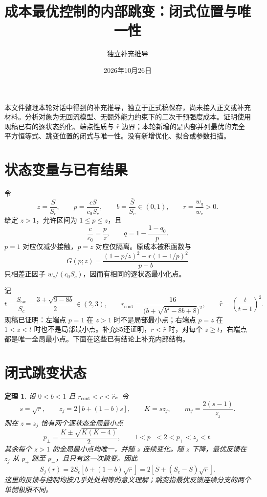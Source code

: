 \documentclass[11pt,a4paper]{ctexart}
\title{成本最优控制的内部跳变：闭式位置与唯一性}
\author{独立补充推导}
\date{2026年10月26日}
\newtheorem{theorem}{定理}
\newcommand{\rcont}{r_{\mathrm{cont}}}
\newcommand{\Sj}{S_j}
\newcommand{\Ssw}{S_{\mathrm{sw}}}
\begin{document}
\maketitle

本文件整理本轮对话中得到的补充推导，独立于正式稿保存，尚未接入正文或补充材料。分析对象为无回流模型、无额外能力约束下的二次干预强度成本。证明使用现稿已有的逐状态约化、端点性质与 $\hat r$ 边界；本轮新增的是内部并列最优的完全平方恒等式、跳变位置的闭式与唯一性。没有新增优化、拟合或参数扫描。

\section{状态变量与已有结果}

令
\[
 z=\frac{S}{S_c},\qquad p=\frac{cS}{c_0S_c},\qquad
 b=\frac{\bar S}{S_c}\in(0,1),\qquad r=\frac{w_q}{w_c}>0.
\]
给定 $z>1$，允许区间为 $1\le p\le z$，且
\[
 \frac{c}{c_0}=\frac pz,\qquad q=1-\frac{1-q_0}{p}.
\]
$p=1$ 对应仅减少接触，$p=z$ 对应仅隔离。原成本被积函数与
\begin{equation}
 G(p;z)=\frac{(1-p/z)^2+r(1-1/p)^2}{p-b}
 \label{eq:G}
\end{equation}
只相差正因子 $w_c/(c_0S_c)$，因而有相同的逐状态最小化点。

记
\begin{equation}
 t=\frac{\Ssw}{S_c}=\frac{3+\sqrt{9-8b}}2\in(2,3),\qquad
 \rcont=\frac{16}{\bigl(b+\sqrt{b^2-8b+8}\bigr)^2},\qquad
 \hat r=\left(\frac{t}{t-1}\right)^2.
 \label{eq:bounds}
\end{equation}
现稿已证明：左端点 $p=1$ 在 $z>1$ 时不是局部最小点；右端点 $p=z$ 在 $1<z<t$ 时也不是局部最小点。补充S5还证明，$r<\hat r$ 时，对每个 $z\ge t$，右端点都是唯一全局最小点。下面在这些已有结论上补充内部结构。

\section{闭式跳变状态}

\begin{theorem}\label{thm:jump}
设 $0<b<1$ 且 $\rcont<r<\hat r$。令
\begin{equation}
 s=\sqrt r,\qquad z_j=2[b+(1-b)s],\qquad
 K=sz_j,\qquad m_j=\frac{2(s-1)}{z_j}.
 \label{eq:jump-def}
\end{equation}
则在 $z=z_j$ 恰有两个逐状态全局最小点
\begin{equation}
 p_\pm=\frac{K\pm\sqrt{K(K-4)}}2,
 \qquad 1<p_-<2<p_+<z_j<t.
 \label{eq:two-roots}
\end{equation}
其余每个 $z>1$ 的全局最小点均唯一，并随 $z$ 连续变化。随 $z$ 下降，最优反馈在 $z_j$ 从 $p_+$ 跳至 $p_-$，且只有这一次跳变。因此
\begin{equation}
 \boxed{\Sj(r)=2S_c[b+(1-b)\sqrt r]
 =2[\bar S+(S_c-\bar S)\sqrt r].}
 \label{eq:Sj}
\end{equation}
这里的反馈与控制均按几乎处处相等的意义理解；跳变指最优反馈连续分支的两个单侧极限不同。
\end{theorem}
\end{document}
